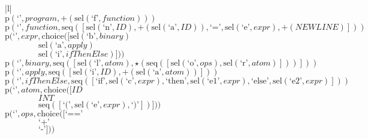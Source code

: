\footnotesize\begin{center}\begin{tabular}{|l|}\hline
{}
\\\hline
$\mathrm{p}(\text{`'},\mathit{program},\plus \left(\mathrm{sel}\left(\text{`f'},\mathit{function}\right)\right))$	\\
$\mathrm{p}(\text{`'},\mathit{function},\mathrm{seq}\left(\left[\mathrm{sel}\left(\text{`n'},\mathit{ID}\right), \plus \left(\mathrm{sel}\left(\text{`a'},\mathit{ID}\right)\right), \text{`='}, \mathrm{sel}\left(\text{`e'},\mathit{expr}\right), \plus \left(\mathit{NEWLINE}\right)\right]\right))$	\\
$\mathrm{p}(\text{`'},\mathit{expr},\mathrm{choice}([\mathrm{sel}\left(\text{`b'},\mathit{binary}\right)$\\$\qquad\qquad\mathrm{sel}\left(\text{`a'},\mathit{apply}\right)$\\$\qquad\qquad\mathrm{sel}\left(\text{`i'},\mathit{ifThenElse}\right)]))$	\\
$\mathrm{p}(\text{`'},\mathit{binary},\mathrm{seq}\left(\left[\mathrm{sel}\left(\text{`l'},\mathit{atom}\right), \star \left(\mathrm{seq}\left(\left[\mathrm{sel}\left(\text{`o'},\mathit{ops}\right), \mathrm{sel}\left(\text{`r'},\mathit{atom}\right)\right]\right)\right)\right]\right))$	\\
$\mathrm{p}(\text{`'},\mathit{apply},\mathrm{seq}\left(\left[\mathrm{sel}\left(\text{`i'},\mathit{ID}\right), \plus \left(\mathrm{sel}\left(\text{`a'},\mathit{atom}\right)\right)\right]\right))$	\\
$\mathrm{p}(\text{`'},\mathit{ifThenElse},\mathrm{seq}\left(\left[\text{`if'}, \mathrm{sel}\left(\text{`c'},\mathit{expr}\right), \text{`then'}, \mathrm{sel}\left(\text{`e1'},\mathit{expr}\right), \text{`else'}, \mathrm{sel}\left(\text{`e2'},\mathit{expr}\right)\right]\right))$	\\
$\mathrm{p}(\text{`'},\mathit{atom},\mathrm{choice}([\mathit{ID}$\\$\qquad\qquad\mathit{INT}$\\$\qquad\qquad\mathrm{seq}\left(\left[\text{`('}, \mathrm{sel}\left(\text{`e'},\mathit{expr}\right), \text{`)'}\right]\right)]))$	\\
$\mathrm{p}(\text{`'},\mathit{ops},\mathrm{choice}([\text{`=='}$\\$\qquad\qquad\text{`+'}$\\$\qquad\qquad\text{`-'}]))$	\\
\hline\end{tabular}\end{center}

